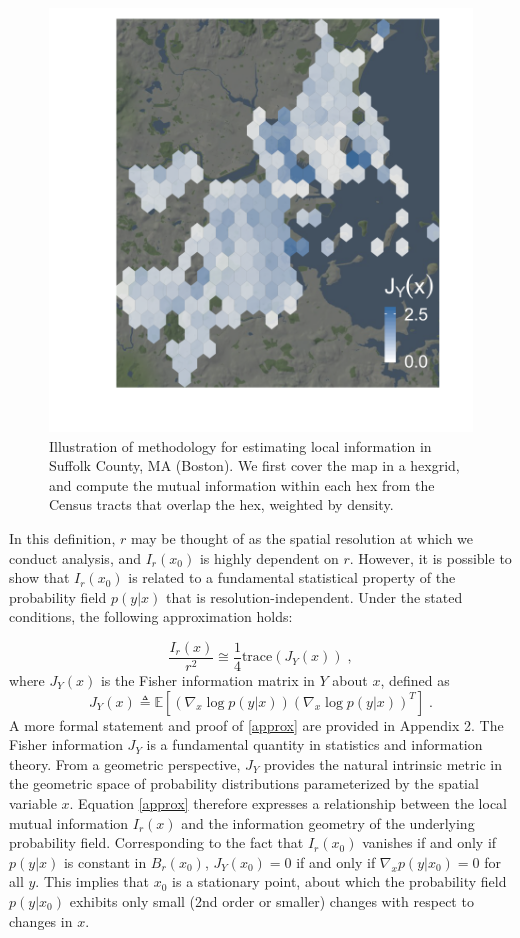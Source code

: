 \documentclass[english]{scrartcl}
\newcommand\E[0]{\mathbb{E}}
\begin{document}
	\begin{figure}
		\centering
		\includegraphics[width=.5\textwidth]{figs/method.png}
		\caption{Illustration of methodology for estimating local information in Suffolk County, MA (Boston). We first cover the map in a hexgrid, and compute the mutual information within each hex from the Census tracts that overlap the hex, weighted by density. }
		\label{fig:method}
	\end{figure}

	In this definition, $r$ may be thought of as the spatial resolution at which we conduct analysis, and $I_r(x_0)$ is highly dependent on $r$. However, it is possible to show that $I_r(x_0)$ is related to a fundamental statistical property of the probability field $p(y|x)$ that is resolution-independent. Under the stated conditions, the following approximation holds: 

	\begin{equation}
		\frac{I_r(x)}{r^2} \cong \frac{1}{4} \text{trace} (J_Y(x))\;, \label{approx}
	\end{equation}
	where $J_Y(x)$ is the Fisher information matrix in $Y$ about $x$, defined as 
	\begin{equation}
		J_Y(x) \triangleq \E\left[ (\nabla_x \log p(y|x))(\nabla_x \log p(y|x))^T \right]\;.
	\end{equation}
	A more formal statement and proof of \eqref{approx} are provided in Appendix 2. The Fisher information $J_Y$ is a fundamental quantity in statistics and information theory. From a geometric perspective, $J_Y$ provides the natural intrinsic metric in the geometric space of probability distributions parameterized by the spatial variable $x$. Equation \eqref{approx} therefore expresses a relationship between the local mutual information $I_r(x)$ and the information geometry of the underlying probability field. Corresponding to the fact that $I_r(x_0)$ vanishes if and only if $p(y|x)$ is constant in $B_r(x_0)$, $J_Y(x_0) = 0$ if and only if $\nabla_x p(y|x_0) = 0$ for all $y$. This implies that $x_0$ is a stationary point, about which the probability field $p(y|x_0)$ exhibits only small (2nd order or smaller) changes with respect to changes in $x$. 
\end{document}
